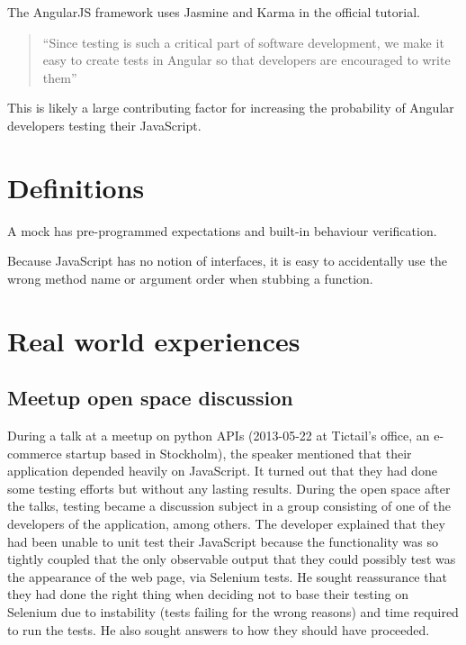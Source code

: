 \documentclass[11pt]{article}
\begin{document}
The AngularJS framework uses Jasmine and Karma in the official tutorial.

\begin{quote}
``Since testing is such a critical part of software development, we make it easy to create tests in Angular so that developers are encouraged to write them''\cite{AngularTemplates}
\end{quote}

This is likely a large contributing factor for increasing the probability of Angular developers testing their JavaScript.

\section{Definitions}

A mock has pre-programmed expectations and built-in behaviour verification\cite[p.~453]{Tddjs}.

Because JavaScript has no notion of interfaces, it is easy to accidentally use the wrong method name or argument order when stubbing a function\cite[p.~471]{Tddjs}.

\section{Real world experiences}

\subsection{Meetup open space discussion}

During a talk at a meetup on python APIs (2013-05-22 at Tictail's office, an e-commerce startup based in Stockholm), the speaker mentioned that their application depended heavily on JavaScript. It turned out that they had done some testing efforts but without any lasting results. During the open space after the talks, testing became a discussion subject in a group consisting of one of the developers of the application, among others. The developer explained that they had been unable to unit test their JavaScript because the functionality was so tightly coupled that the only observable output that they could possibly test was the appearance of the web page, via Selenium tests. He sought reassurance that they had done the right thing when deciding not to base their testing on Selenium due to instability (tests failing for the wrong reasons) and time required to run the tests. He also sought answers to how they should have proceeded.
\end{document}
